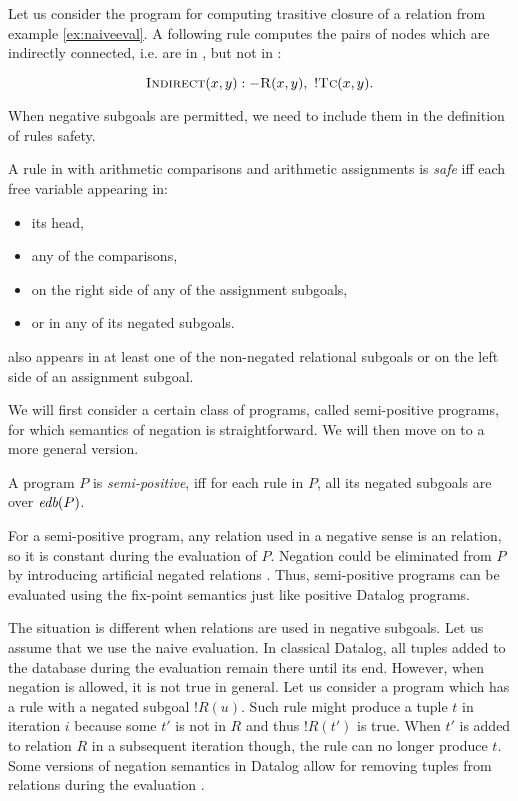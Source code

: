 \begin{exmp}
Let us consider the program for computing trasitive closure  of a relation  from example \ref{ex:naiveeval}. A following rule computes the pairs of nodes which are indirectly connected, i.e. are in , but not in :

$$\textsc{Indirect}(x, y) :- \textsc{R}(x, y),~!\textsc{Tc}(x, y).$$
\end{exmp}

When negative subgoals are permitted, we need to include them in the definition of rules safety. 

\begin{defn}\label{d:datalogeqsaferule}
A rule in \datalogneg with arithmetic comparisons and arithmetic assignments is \emph{safe} iff each free variable appearing in:
\begin{itemize}
\item its head,
\item any of the comparisons,
\item on the right side of any of the assignment subgoals,
\item or in any of its negated subgoals.
\end{itemize}
also appears in at least one of the non-negated relational subgoals or on the left side  of an assignment subgoal.
\end{defn}

We will first consider a certain class of \datalogneg programs, called semi-positive programs, for which semantics of negation is straightforward. We will then move on to a more general version.

\begin{defn}
A \datalogneg program $P$ is \emph{semi-positive}, iff for each rule in $P$, all its negated subgoals are over $\textit{edb}(P)$.
\end{defn}

For a semi-positive program, any relation used in a negative sense is an \edb relation, so it is constant during the evaluation of $P$. Negation could be eliminated from $P$ by introducing artificial negated \edb relations . Thus, semi-positive programs can be evaluated using the fix-point semantics just like positive Datalog programs.

The situation is different when \idb relations are used in negative subgoals. Let us assume that we use the naive evaluation. In classical Datalog, all tuples added to the database during the evaluation remain there until its end. However, when negation is allowed, it is not true in general. Let us consider a program which has a rule with a negated subgoal $!R(u)$. Such rule might produce a tuple $t$ in iteration $i$ because some $t'$ is not in $R$ and thus $!R(t')$ is true. When $t'$ is added to relation $R$ in a subsequent iteration though, the rule can no longer produce $t$. Some versions of negation semantics in Datalog allow for removing tuples from relations during the evaluation \cite{fod}.

